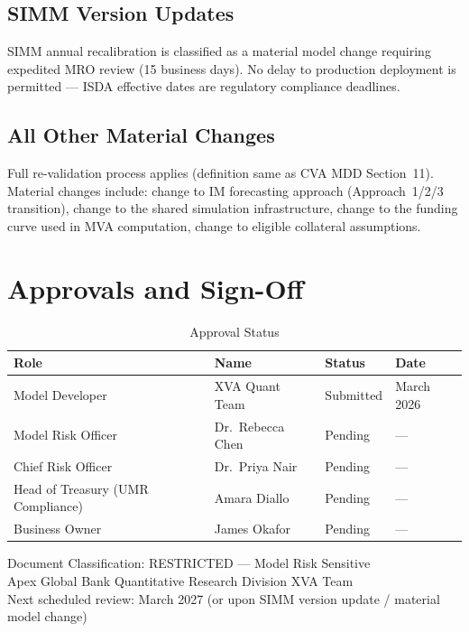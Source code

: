 \documentclass[11pt,a4paper]{article}
\begin{document}
\subsection{SIMM Version Updates}

SIMM annual recalibration is classified as a material model change requiring expedited MRO
review (15 business days). No delay to production deployment is permitted --- ISDA effective
dates are regulatory compliance deadlines.

\subsection{All Other Material Changes}

Full re-validation process applies (definition same as CVA MDD Section~11). Material changes
include: change to IM forecasting approach (Approach~1/2/3 transition), change to the
shared simulation infrastructure, change to the funding curve used in MVA computation,
change to eligible collateral assumptions.

\section{Approvals and Sign-Off}

\begin{table}[h!]
\centering
\caption{Approval Status}
\begin{tabular}{@{}llll@{}}
\toprule
\textbf{Role} & \textbf{Name} & \textbf{Status} & \textbf{Date} \\
\midrule
Model Developer                & XVA Quant Team    & Submitted & March 2026 \\
Model Risk Officer             & Dr.\ Rebecca Chen & Pending   & --- \\
Chief Risk Officer             & Dr.\ Priya Nair   & Pending   & --- \\
Head of Treasury (UMR Compliance) & Amara Diallo   & Pending   & --- \\
Business Owner                 & James Okafor      & Pending   & --- \\
\bottomrule
\end{tabular}
\end{table}

\vspace{1cm}
\noindent\textcolor{apexgray}{\footnotesize
Document Classification: RESTRICTED --- Model Risk Sensitive\\
Apex Global Bank \textbar{} Quantitative Research Division \textbar{} XVA Team\\
Next scheduled review: March 2027 (or upon SIMM version update / material model change)
}
\end{document}
